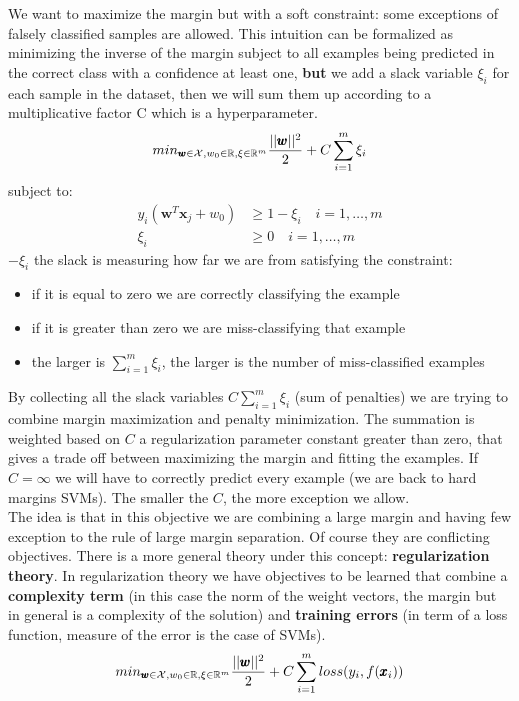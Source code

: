     We want to maximize the margin but with a soft constraint: some exceptions of falsely classified samples are allowed.
    This intuition can be formalized as minimizing the inverse of the margin subject to all examples being predicted in the correct class with a confidence at least one, \textbf{but} we add a slack variable $\xi_i$ for each sample in the dataset, then we will sum them up according to a multiplicative factor C which is a hyperparameter.
    $$min_{\pmb{w} \in \mathcal{X}, w_0 \in \mathbb{R}, \xi \in \mathbb{R}^m} \frac{||\pmb{w}||^2}{2} + C\sum_{i=1}^m \xi_i$$
    subject to: 
    \begin{align*}
        y_i(\pmb{w}^T \pmb{x}_j + w_0) &\geq 1 - \xi_i \quad i = 1, \dots, m\\
        \xi_i &\geq 0 \quad i = 1, \dots, m
    \end{align*}
    $- \xi_i$ the slack is measuring how far we are from satisfying the constraint:
    \begin{itemize}
        \item if it is equal to zero we are correctly classifying the example
        \item if it is greater than zero we are miss-classifying that example
        \item the larger is $\sum_{i=1}^m \xi_i$, the larger is the number of miss-classified examples
    \end{itemize}
    By collecting all the slack variables $C\sum_{i=1}^m \xi_i$ (sum of penalties) we are trying to combine margin maximization and penalty minimization. 
    The summation is weighted based  on $C$ a regularization parameter constant greater than zero, that gives a trade off between maximizing the margin and fitting the examples. 
    If $C = \infty$ we will have to correctly predict every example (we are back to hard margins SVMs). The smaller the $C$, the more exception we allow.\\
    
    The idea is that in this objective we are combining a large margin and having few exception to the rule of large margin separation. 
    Of course they are conflicting objectives. 
    There is a more general theory under this concept: \textbf{regularization theory}. In regularization theory we have objectives to be learned that combine a \textbf{complexity term} (in this case the norm of the weight vectors, the margin but in general is a complexity of the solution) and \textbf{training errors} (in term of a loss function, measure of the error is the case of SVMs). 
    $$min_{\pmb{w} \in \mathcal{X}, w_0 \in \mathbb{R}, \xi \in \mathbb{R}^m} \frac{||\pmb{w}||^2}{2} + C\sum_{i=1}^m loss(y_i, f(\pmb{x}_i))$$

